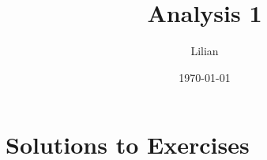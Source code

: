 



\author{Lilian}
\date{\today}
\title{Analysis 1}


\frontmatter
\pagestyle{empty}
\tableofcontents
\restoregeometry

\mainmatter
\pagestyle{fullwidth}





\backmatter
\pagestyle{empty}
\chapter*{Solutions to Exercises}
\printsolutionsbysection


